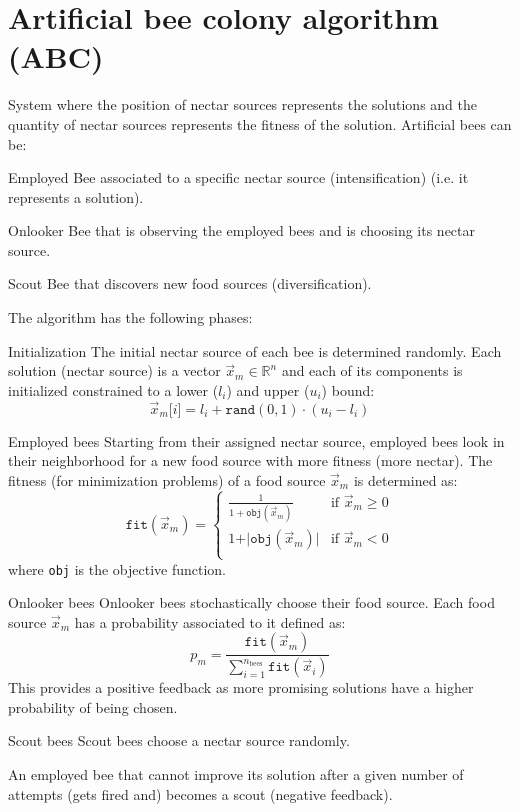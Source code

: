 \section{Artificial bee colony algorithm (ABC)}

System where the position of nectar sources represents the solutions and
the quantity of nectar sources represents the fitness of the solution.
Artificial bees can be:
\begin{descriptionlist}
    \item[Employed] 
        Bee associated to a specific nectar source (intensification) (i.e. it represents a solution).
    \item[Onlooker]
        Bee that is observing the employed bees and is choosing its nectar source.
    \item[Scout]
        Bee that discovers new food sources (diversification).
\end{descriptionlist}

The algorithm has the following phases:
\begin{descriptionlist}
    \item[Initialization] 
        The initial nectar source of each bee is determined randomly.
        Each solution (nectar source) is a vector $\vec{x}_m \in \mathbb{R}^n$ and 
        each of its components is initialized constrained to a lower ($l_i$) and upper ($u_i$) bound:
        \[ \vec{x}_m\texttt{[}i\texttt{]} = l_i + \texttt{rand}(0, 1) \cdot (u_i - l_i) \]
    
    \item[Employed bees] 
        Starting from their assigned nectar source, employed bees look in their neighborhood for a new food source with more fitness (more nectar).
        The fitness (for minimization problems) of a food source $\vec{x}_m$ is determined as:
        \[ \texttt{fit}(\vec{x}_m) = \begin{cases}
            \frac{1}{1 + \texttt{obj}(\vec{x}_m)}   & \text{if } \vec{x}_m \geq 0 \\
            1 + \vert \texttt{obj}(\vec{x}_m) \vert & \text{if } \vec{x}_m < 0 \\
        \end{cases} \]
        where \texttt{obj} is the objective function.

    \item[Onlooker bees] 
        Onlooker bees stochastically choose their food source.
        Each food source $\vec{x}_m$ has a probability associated to it defined as:
        \[ p_m = \frac{\texttt{fit}(\vec{x}_m)}{\sum_{i=1}^{n_\text{bees}} \texttt{fit}(\vec{x}_i)} \]
        This provides a positive feedback as more promising solutions have a higher probability of being chosen.

    \item[Scout bees] 
        Scout bees choose a nectar source randomly.

        An employed bee that cannot improve its solution after a given number of attempts {\tiny(gets fired and)} becomes a scout (negative feedback).
\end{descriptionlist}

